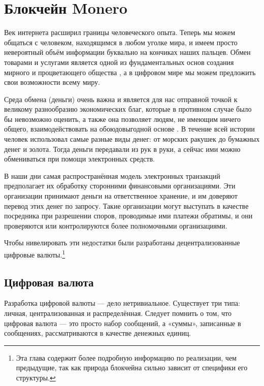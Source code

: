 \chapter{Блокчейн Monero}
\label{chapter:blockchain}

Век интернета расширил границы человеческого опыта. Теперь мы можем общаться с челове\-ком, находящимся в любом уголке мира, и имеем просто невероятный объём информации буквально на кончиках наших пальцев. Обмен товарами и услугами является одной из фундаментальных основ создания мирного и процветающего общества \cite{human-action}, а в цифровом мире мы можем предложить свои возможности всему миру.

Среда обмена (деньги) очень важна и является для нас отправной точкой к великому разнооб\-разию экономических благ, которые в противном случае было бы невозможно оценить, а также она позволяет людям, не имеющим ничего общего, взаимодействовать на обоюдовыгод\-ной основе \cite{human-action}. В течение всей истории человек использовал самые разные виды денег: от морских ракушек до бумажных денег и золота. Тогда деньги передавали из рук в руки, а сейчас ими можно обмениваться при помощи электронных средств.

В наши дни самая распространённая модель электронных транзакций предполагает их обра\-ботку сторонними финансовыми организациями. Эти организации принимают деньги на ответственное хранение, и им доверяют перевод этих денег по запросу. Такие организации могут выступать в качестве посредника при разрешении споров, проводимые ими платежи обратимы, и они проверяются или контролируются более полномочными организациями. \cite{Nakamoto_bitcoin}

Чтобы нивелировать эти недостатки были разработаны децентрализованные цифровые валю\-ты.\footnote{Эта глава содержит более подробную информацию по реализации, чем предыдущие, так как природа блокчейна сильно зависит от специфики его структуры.}



\section{Цифровая валюта}
\label{sec:digital-currency}

Разработка цифровой валюты — дело нетривиальное. Существует три типа: личная, центра\-лизованная и распределённая. Следует помнить о том, что цифровая валюта — это просто набор сообщений, а «суммы», записанные в сообщениях, рассматриваются в качестве денеж\-ных единиц.

